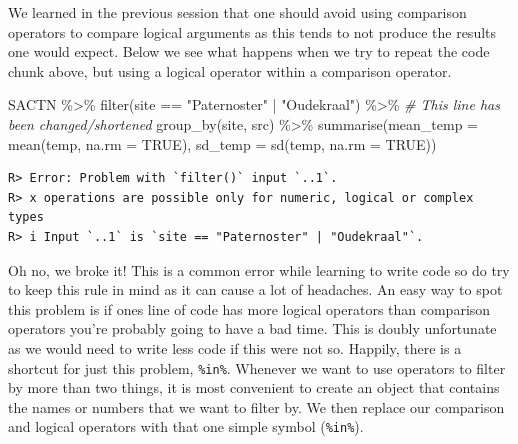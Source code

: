 \documentclass[
]{book}
\newenvironment{Shaded}{\begin{snugshade}}{\end{snugshade}}
\newcommand{\AttributeTok}[1]{\textcolor[rgb]{0.77,0.63,0.00}{#1}}
\newcommand{\CommentTok}[1]{\textcolor[rgb]{0.56,0.35,0.01}{\textit{#1}}}
\newcommand{\ConstantTok}[1]{\textcolor[rgb]{0.00,0.00,0.00}{#1}}
\newcommand{\FunctionTok}[1]{\textcolor[rgb]{0.00,0.00,0.00}{#1}}
\newcommand{\NormalTok}[1]{#1}
\newcommand{\SpecialCharTok}[1]{\textcolor[rgb]{0.00,0.00,0.00}{#1}}
\newcommand{\StringTok}[1]{\textcolor[rgb]{0.31,0.60,0.02}{#1}}
\begin{document}
We learned in the previous session that one should avoid using comparison operators to compare logical arguments as this tends to not produce the results one would expect. Below we see what happens when we try to repeat the code chunk above, but using a logical operator within a comparison operator.

\begin{Shaded}
\begin{Highlighting}[]
\NormalTok{SACTN }\SpecialCharTok{\%\textgreater{}\%} 
  \FunctionTok{filter}\NormalTok{(site }\SpecialCharTok{==} \StringTok{"Paternoster"} \SpecialCharTok{|} \StringTok{"Oudekraal"}\NormalTok{) }\SpecialCharTok{\%\textgreater{}\%} \CommentTok{\# This line has been changed/shortened}
  \FunctionTok{group\_by}\NormalTok{(site, src) }\SpecialCharTok{\%\textgreater{}\%} 
  \FunctionTok{summarise}\NormalTok{(}\AttributeTok{mean\_temp =} \FunctionTok{mean}\NormalTok{(temp, }\AttributeTok{na.rm =} \ConstantTok{TRUE}\NormalTok{), }
            \AttributeTok{sd\_temp =} \FunctionTok{sd}\NormalTok{(temp, }\AttributeTok{na.rm =} \ConstantTok{TRUE}\NormalTok{))}
\end{Highlighting}
\end{Shaded}

\begin{verbatim}
R> Error: Problem with `filter()` input `..1`.
R> x operations are possible only for numeric, logical or complex types
R> i Input `..1` is `site == "Paternoster" | "Oudekraal"`.
\end{verbatim}

Oh no, we broke it! This is a common error while learning to write code so do try to keep this rule in mind as it can cause a lot of headaches. An easy way to spot this problem is if ones line of code has more logical operators than comparison operators you're probably going to have a bad time. This is doubly unfortunate as we would need to write less code if this were not so. Happily, there is a shortcut for just this problem, \texttt{\%in\%}. Whenever we want to use operators to filter by more than two things, it is most convenient to create an object that contains the names or numbers that we want to filter by. We then replace our comparison and logical operators with that one simple symbol (\texttt{\%in\%}).
\end{document}
